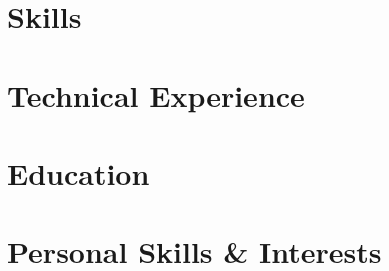 \documentclass[letter,10pt]{article}
\begin{document}


\section{Skills}


\section{Technical Experience}


\section{Education}



\section{Personal Skills \& Interests}

\end{document}

